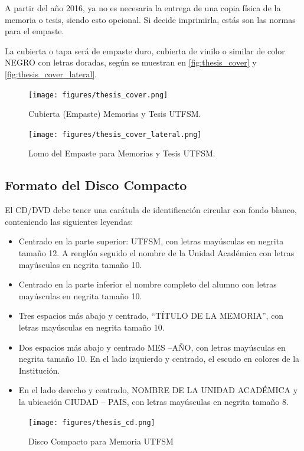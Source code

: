 A partir del año 2016, ya no es necesaria la entrega de una copia física de la memoria o tesis, siendo esto opcional. Si decide imprimirla, estás son las normas para el empaste.

La cubierta o tapa será de empaste duro, cubierta de vinilo o similar de color NEGRO con letras doradas, según se muestran en \autoref{fig:thesis_cover} y \autoref{fig:thesis_cover_lateral}.

\begin{figure}[ht!]
\centering
\texttt{[image: figures/thesis\_cover.png]}
\caption{Cubierta (Empaste) Memorias y Tesis UTFSM.}
\label{fig:thesis_cover}
\end{figure}

\begin{figure}[ht!]
\centering
\texttt{[image: figures/thesis\_cover\_lateral.png]}
\caption{Lomo del Empaste para Memorias y Tesis UTFSM.}
\label{fig:thesis_cover_lateral}
\end{figure}

\subsection{Formato del Disco Compacto}

El CD/DVD debe tener una carátula de identificación circular con fondo blanco, conteniendo las siguientes leyendas:

\begin{itemize}
		\item
    Centrado en la parte superior: UTFSM, con letras mayúsculas en negrita tamaño 12. A renglón seguido el nombre de la Unidad Académica con letras mayúsculas en negrita tamaño 10.
		\item
    Centrado en la parte inferior el nombre completo del alumno con letras mayúsculas en negrita tamaño 10.
		\item
    Tres espacios más abajo y centrado, “TÍTULO DE LA MEMORIA”, con letras mayúsculas en negrita tamaño 10.
		\item
    Dos espacios más abajo y centrado MES –AÑO, con letras mayúsculas en negrita tamaño 10.
    En el lado izquierdo y centrado, el escudo en colores de la Institución.
		\item
    En el lado derecho y centrado, NOMBRE DE LA UNIDAD ACADÉMICA y la ubicación CIUDAD – PAIS, con letras mayúsculas en negrita tamaño 8.
\end{itemize}

\begin{figure}[ht!]
\centering
\texttt{[image: figures/thesis\_cd.png]}
\caption{Disco Compacto para Memoria UTFSM}
\label{fig:thesis_cd}
\end{figure}


